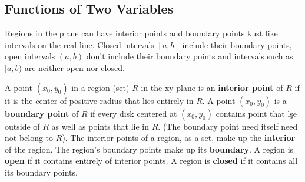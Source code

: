 \documentclass[12pt,a4paper,draft]{article}
\newenvironment{definition}{\begin{definitionbox}}{\end{definitionbox}\vspace{1\baselineskip}}
\begin{document}
\newpage


\subsection{Functions of Two Variables}

Regions in the plane can have interior points and boundary points kust like intervals on the real line.
Closed intervals \([a, b]\) include their boundary points, open intervals \((a,b)\) don't include their boundary points and intervals such as \([a,b)\) are neither open nor closed.

\begin{definition}
    A point \((x_0, y_0)\) in a region (set) \(R\) in the xy-plane is an \textbf{interior point} of \(R\) if it is the center of positive radius that lies entirely in \(R\).
    A point \((x_0, y_0)\) is a \textbf{boundary point} of \(R\) if every disk centered at \((x_0, y_0)\) contains point that lşe outside of \(R\)  as well as points that lie in \(R\). (The boundary point need itself need not belong to \(R\)).
    The interior points of a region, as a set, make up the \textbf{interior} of the region. The region's boundary points make up its \textbf{boundary}.
    A region is \textbf{open} if it contains entirely of interior points. A region is \textbf{closed} if it contains all its boundary points.

\end{definition}
\end{document}
